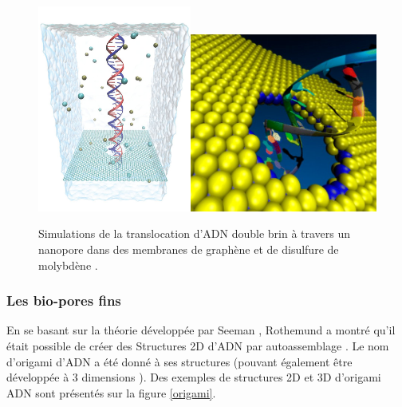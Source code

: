 \begin{figure}[h!]
\begin{center}
\includegraphics[width=0.45\textwidth]{dnatranslocsim.jpg}\includegraphics[width=0.55\textwidth]{mos2simul.jpg}

\caption[Translocation et cristaux bidimensionnels]{Simulations de la translocation d'ADN double brin à travers un nanopore dans des membranes de graphène \cite{Sathe2011} et de disulfure de molybdène \cite{Farimani2014}.}
\label{simultranslocboth}
\end{center}
\end{figure}

\newpage

\subsubsection{Les bio-pores fins}

En se basant sur la théorie développée par Seeman \cite{Seeman1982}, Rothemund a montré qu'il était possible de créer des Structures 2D d'ADN par autoassemblage \cite{Rothemund2006}. Le nom d'origami d'ADN a été donné à ses structures (pouvant également être développée à 3 dimensions \cite{Kuzuya2009}). Des exemples de structures 2D et 3D d'origami ADN sont présentés sur la figure \ref{origami}. 

